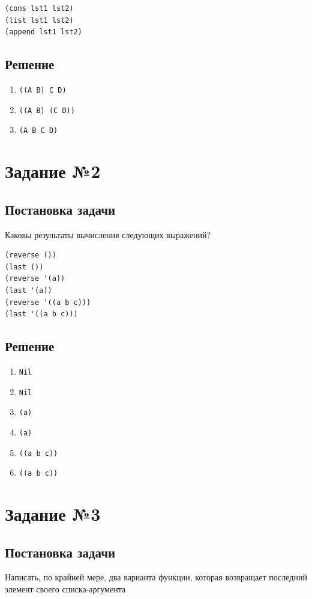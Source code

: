 \documentclass[12pt]{report}
\begin{document}
\begin{lstlisting}
(cons lst1 lst2)
(list lst1 lst2)
(append lst1 lst2)
\end{lstlisting}

\subsection*{Решение}
\begin{enumerate}
	\item \texttt{((A B) C D)}
	\item \texttt{((A B) (C D))}
	\item \texttt{(A B C D)}
\end{enumerate}

\section*{Задание №2}
\subsection*{Постановка задачи}
Каковы результаты вычисления следующих выражений?

\begin{lstlisting}
(reverse ())
(last ())
(reverse '(a))
(last '(a))
(reverse '((a b c)))
(last '((a b c)))
\end{lstlisting}


\subsection*{Решение}
\begin{enumerate}
	\item \texttt{Nil}
	\item \texttt{Nil}
	\item \texttt{(a)}
	\item \texttt{(a)}
	\item \texttt{((a b c))}
	\item \texttt{((a b c))}
\end{enumerate}

\section*{Задание №3}
\subsection*{Постановка задачи}
Написать, по крайней мере, два варианта функции, которая возвращает последний элемент своего списка-аргумента
\end{document}
